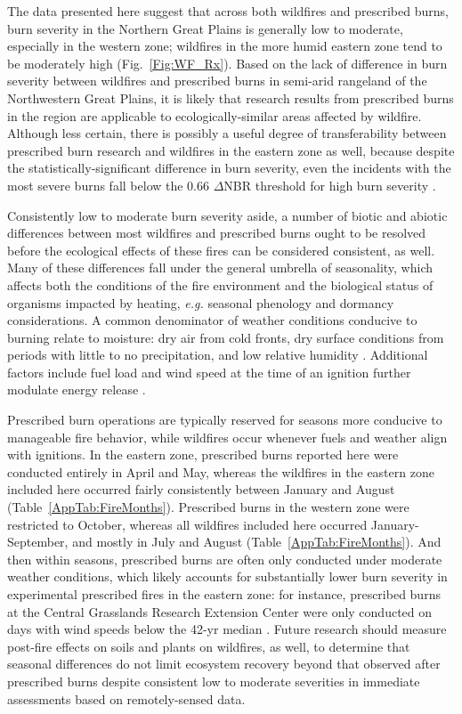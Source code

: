 \documentclass[fire,article,submit,oneauthor,pdftex]{Definitions/mdpi}
\begin{document}
The data presented here suggest that across both wildfires and prescribed burns, burn severity in the Northern Great Plains is generally low to moderate, especially in the western zone; wildfires in the more humid eastern zone tend to be moderately high (Fig.~\ref{Fig:WF_Rx}).
Based on the lack of difference in burn severity between wildfires and prescribed burns in semi-arid rangeland of the Northwestern Great Plains, it is likely that research results from prescribed burns in the region are applicable to ecologically-similar areas affected by wildfire. 
Although less certain, there is possibly a useful degree of transferability between prescribed burn research and wildfires in the eastern zone as well, because despite the statistically-significant difference in burn severity, even the incidents with the most severe burns fall below the 0.66 $\Delta$NBR threshold for high burn severity \cite{key2006a}. 

Consistently low to moderate burn severity aside, a number of biotic and abiotic differences between most wildfires and prescribed burns ought to be resolved before the ecological effects of these fires can be considered consistent, as well. 
Many of these differences fall under the general umbrella of seasonality, which affects both the conditions of the fire environment and the biological status of organisms impacted by heating, \emph{e.g.} seasonal phenology and dormancy considerations. 
A common denominator of weather conditions conducive to burning relate to moisture: dry air from cold fronts, dry surface conditions from periods with little to no precipitation, and low relative humidity \cite{flannigan2001}. 
Additional factors include fuel load and wind speed at the time of an ignition further modulate energy release \cite{cheney1995, reid2010, kidnie2015, gomes2020}.

Prescribed burn operations are typically reserved for seasons more conducive to manageable fire behavior, while wildfires occur whenever fuels and weather align with ignitions. 
In the eastern zone, prescribed burns reported here were conducted entirely in April and May, whereas the wildfires in the  eastern zone included here occurred fairly consistently between January and August (Table~\ref{AppTab:FireMonths}). 
Prescribed burns in the western zone were restricted to October, whereas all wildfires included here occurred January-September, and mostly in July and August (Table~\ref{AppTab:FireMonths}). 
And then within seasons, prescribed burns are often only conducted under moderate weather conditions, which likely accounts for substantially lower burn severity in experimental prescribed fires in the eastern zone: for instance, prescribed burns at the Central Grasslands Research Extension Center were only conducted on days with wind speeds below the 42-yr median \cite{mcgranahan2025}. 
Future research should measure post-fire effects on soils and plants on wildfires, as well, to determine that seasonal differences do not limit ecosystem recovery beyond that observed after prescribed burns despite consistent low to moderate severities in immediate assessments based on remotely-sensed data. 
\end{document}
